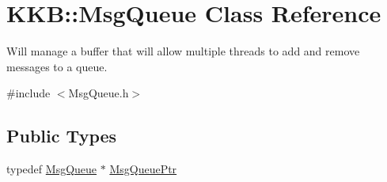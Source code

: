 \hypertarget{class_k_k_b_1_1_msg_queue}{}\section{K\+KB\+:\+:Msg\+Queue Class Reference}
\label{class_k_k_b_1_1_msg_queue}


Will manage a buffer that will allow multiple threads to add and remove messages to a queue.  




{\ttfamily \#include $<$Msg\+Queue.\+h$>$}

\subsection*{Public Types}
\begin{DoxyCompactItemize}
\item 
typedef \hyperlink{class_k_k_b_1_1_msg_queue}{Msg\+Queue} $\ast$ \hyperlink{class_k_k_b_1_1_msg_queue_a4799b7792832f5357e7679b252f7a750}{Msg\+Queue\+Ptr}
\end{DoxyCompactItemize}
